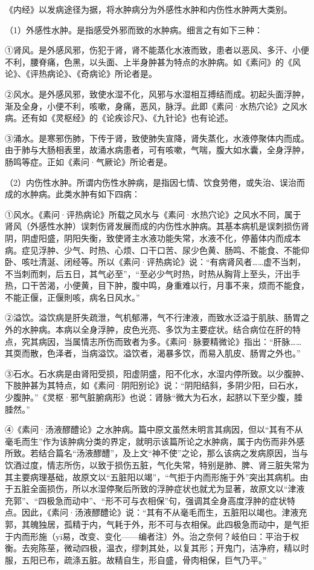 \documentclass[draft,12pt]{ctexbook}
\begin{document}
《内经》以发病途径为据，将水肿病分为外感性水肿和内伤性水肿两大类别。

（1）外感性水肿。是指感受外邪而致的水肿病。细言之有如下三种：

①肾风。是外感风邪，伤犯于肾，肾不能蒸化水液而致，患者以恶风、多汗、小便不利，腰脊痛，色黑，以头面、上半身肿甚为特点的水肿病。如《素问》的《风论》、《评热病论》、《奇病论》所论者是。

②风水。是外感风邪，致使水湿不化，风邪与水湿相互搏结而成。初起头面浮肿，渐及全身，小便不利，咳嗽，身痛，恶风，脉浮。此即《素问·水热穴论》之风水病。还有如《灵枢经》的《论疾诊尺》、《九针论》也有论述。

③涌水。是寒邪伤肺，下传于肾，致使肺失宣降，肾失蒸化，水液停聚体内而成。由于肺与大肠相表里，故涌水病患者，可有咳嗽，气喘，腹大如水囊，全身浮肿，肠鸣等症。正如《素问·气厥论》所论者是。

（2）内伤性水肿。所谓内伤性水肿病，是指因七情、饮食劳倦，或失治、误治而成的水肿病。此类水肿有如下四病：

①风水。《素问·评热病论》所载之风水与《素问·水热穴论》之风水不同，属于肾风（外感性水肿）误刺伤肾发展而成的内伤性水肿病。其基本病机是误刺损伤肾阴，阴虚阳盛，阴阳失衡，致使肾主水液功能失常，水液不化，停蓄体内而成本病。症见浮肿、少气、时热、心烦、口干口苦、尿少色黄、肠鸣、不能食、不能仰卧、咳吐清涎、闭经等。所以《素问·评热病论》说：“有病肾风者……虚不当刺，不当刺而刺，后五日，其气必至”，“至必少气时热，时热从胸背上至头，汗出手热，口干苦渴，小便黄，目下肿，腹中鸣，身重难以行，月事不来，烦而不能食，不能正偃，正偃則咳，病名日风水。”

②溢饮。溢饮病是肝失疏泄，气机郁滞，气不行津液，而致水泛溢于肌肤、肠胃之外的水肿病。本病以全身浮肿，皮色光亮、多饮为主要症状。结合病位在肝的特点，究其病因，当属情志所伤而致者为多。《素问·脉要精微论》指出：“肝脉……其耎而散，色泽者，当病溢饮。溢饮者，渴暴多饮，而易入肌皮、肠胃之外也。”

③石水。石水病是由肾阳受损，阳虚阴盛，阳不化水，水湿内停所致。以少腹肿、下肢肿甚为其特点，如《素问·阴阳别论》说：“阴阳结斜，多阴少阳，曰石水，少腹肿。”《灵枢·邪气脏腑病形》也说：肾脉“微大为石水，起脐以下至少腹，腄腄然。”

④《素问·汤液醪醴论》之水肿病。篇中原文虽然未明言其病因，但以“其有不从毫毛而生”作为该肿病分类的界定，就明示该篇所论之水肿病，属于内伤而非外感所致。若结合篇名“汤液醪醴”，及上文“神不使”之论，那么该病之发病原因，当与饮酒过度，情志所伤，以致于损伤五脏，气化失常，特别是肺、脾、肾三脏失常为其主要病理基础，故原文以“五脏阳以竭”，“气拒于内而形施于外”突出其病机。由于五脏全面损伤，所以水湿停聚后所致的浮肿症状也就尤为显著，故原文以“津液充郭”、“四极急而动中”、“形不可与衣相保”句，强调其全身高度浮肿的症状特点。因此，《素问·汤液醪醴论》说：“其有不从毫毛而生，五脏阳以竭也。津液充郭，其魄独居，孤精于内，气耗于外，形不可与衣相保。此四极急而动中，是气拒于内而形施（yī易，改变、变化——编者注）外。治之奈何？岐伯曰：平治于权衡。去宛陈莝，微动四极，温衣，缪刺其处，以复其形；开鬼门，洁净府，精以时服，五阳已布，疏涤五脏。故精自生，形自盛，骨肉相保，巨气乃平。”
\end{document}
